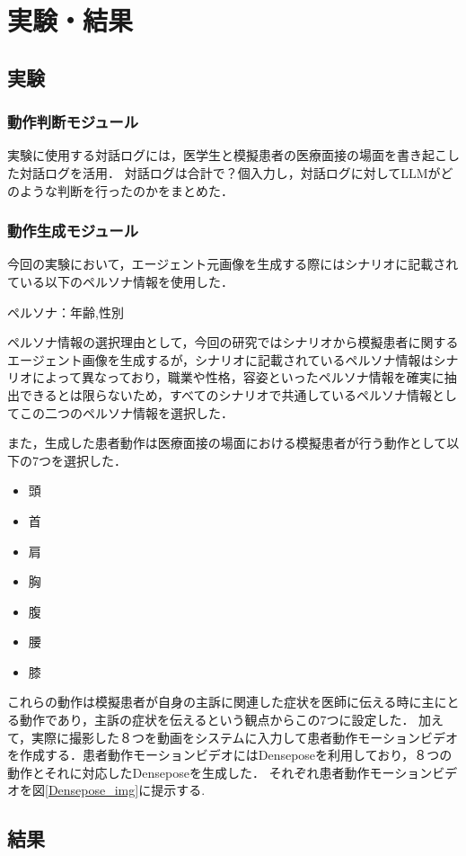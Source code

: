 \section{実験・結果}\label{result}

\subsection{実験}
\subsubsection*{動作判断モジュール}
実験に使用する対話ログには，医学生と模擬患者の医療面接の場面を書き起こした対話ログを活用．
対話ログは合計で？個入力し，対話ログに対してLLMがどのような判断を行ったのかをまとめた．

\subsubsection*{動作生成モジュール}
今回の実験において，エージェント元画像を生成する際にはシナリオに記載されている以下のペルソナ情報を使用した．
\centerline{ペルソナ：年齢,性別}

ペルソナ情報の選択理由として，今回の研究ではシナリオから模擬患者に関するエージェント画像を生成するが，シナリオに記載されているペルソナ情報はシナリオによって異なっており，職業や性格，容姿といったペルソナ情報を確実に抽出できるとは限らないため，すべてのシナリオで共通しているペルソナ情報としてこの二つのペルソナ情報を選択した．


また，生成した患者動作は医療面接の場面における模擬患者が行う動作として以下の7つを選択した．
 \begin{itemize}
  \item 頭
  \item 首
  \item 肩
  \item 胸
  \item 腹
  \item 腰
  \item 膝
 \end{itemize}
これらの動作は模擬患者が自身の主訴に関連した症状を医師に伝える時に主にとる動作であり，主訴の症状を伝えるという観点からこの7つに設定した．
加えて，実際に撮影した８つを動画をシステムに入力して患者動作モーションビデオを作成する．患者動作モーションビデオにはDenseposeを利用しており，８つの動作とそれに対応したDenseposeを生成した．
それぞれ患者動作モーションビデオを図\ref{Densepose_img}に提示する. 

\subsection{結果}
